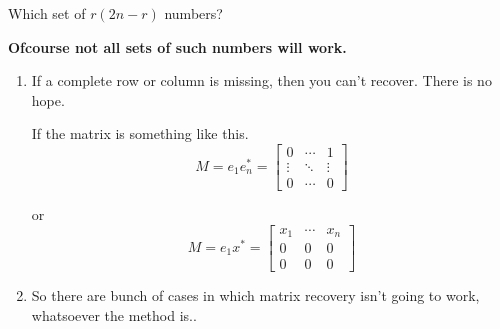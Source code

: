 \documentclass{beamer}
\begin{document}
\begin{frame}{Which set of $r(2n-r)$ numbers?}

	\textbf {Ofcourse not all sets of such numbers will work.}
	\begin{enumerate}
		\item If a complete row or column is missing, then you can't recover. There is no hope.
		\begin{item} If the matrix is something like this.
			$$M = e_1e_n^* = \left[
			\begin{array}{ccc}
			0&\cdots&1\\
			\vdots&\ddots&\vdots\\
			0&\cdots&0
			\end{array}
			\right]$$
		\end{item}

		\begin{item} or
			$$M = e_1x^* = \left[
			\begin{array}{ccc}
			x_1&\cdots&x_n\\
			0&0&0\\
			0&0&0
			\end{array}
			\right]$$
		\end{item}
		\vspace{3mm}
		\item So there are bunch of cases in which matrix recovery isn't going to work, whatsoever the method is..

	\end{enumerate}
	\vspace{5mm}
\end{frame}
\end{document}
